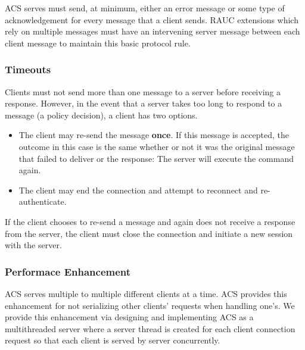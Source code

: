 ACS serves must send, at minimum, either an error message or some type of acknowledgement for every message that a client sends. RAUC extensions which rely on multiple messages must have an intervening server message between each client message to maintain this basic protocol rule. 

\subsubsection{Timeouts}
Clients must not send more than one message to a server before receiving a response. However, in the event that a server takes too long to respond to a message (a policy decision), a client has two options.
\begin{itemize}
\item{The client may re-send the message \textbf{once}. If this message is accepted, the outcome in this case is the same whether or not it was the original message that failed to deliver or the response: The server will execute the command again.}
\item{The client may end the connection and attempt to reconnect and re-authenticate.}
\end{itemize}

If the client chooses to re-send a message and again does not receive a response from the server, the client must close the connection and initiate a new session with the server.

\subsubsection{Performace Enhancement}
ACS serves multiple to multiple different clients at a time. ACS provides this enhancement for not serializing other clients' requests when handling one's. We provide this enhancement via designing and implementing ACS as a multithreaded server where a server thread is created for each client connection request so that each client is served by server concurrently.
